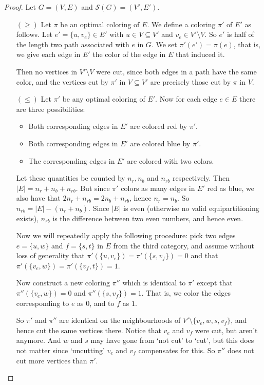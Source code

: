 	\begin{proof}
		Let $G = (V, E)$ and $\mathcal{S}(G) = (V', E')$.
		\begin{enumerate}
			\item[$(\geq)$] Let $\pi$ be an optimal coloring of $E$. We define
					a coloring $\pi'$ of $E'$ as follows. Let
					$e' = \{u, v_e\} \in E'$ with $u \in V \subseteq V'$ and
					$v_e \in V' \setminus V$. So $e'$ is half of the length two
					path associated with $e$ in $G$. We set
					$\pi'(e') = \pi(e)$, that is, we give each edge in $E'$ the
					color of the edge in $E$ that induced it.

					Then no vertices in $V'\setminus V$ were cut, since
					both edges in a path have the same color, and the vertices
					cut by $\pi'$ in $V \subseteq V'$ are precisely those
					cut by $\pi$ in $V$.
			\item[$(\leq)$] Let $\pi'$ be any optimal coloring of $E'$. Now for
					each edge $e \in E$ there are three possibilities:
					\begin{itemize}
						\item Both corresponding edges in $E'$ are colored red
							by $\pi'$.
						\item Both corresponding edges in $E'$ are colored blue
							by $\pi'$.
						\item The corresponding edges in $E'$ are colored with
							two colors.
					\end{itemize}
					Let these quantities be counted by $n_r, n_b$ and $n_{rb}$
					respectively. Then $|E| = n_r + n_b + n_{rb}$. But since
					$\pi'$ colors as many edges in $E'$ red as blue, we also
					have that $2n_r + n_{rb} = 2n_b + n_{rb}$, hence
					$n_r = n_b$. So $n_{rb} = |E| - (n_r + n_b)$. Since $|E|$
					is even (otherwise no valid equipartitioning exists),
					$n_{rb}$ is the difference between two even numbers, and
					hence even.

					Now we will repeatedly apply the following procedure: pick
					two edges $e = \{u, w\}$ and $f = \{s, t\}$ in $E$
					from the third category, and assume
					without loss of generality that
					$\pi'(\{u, v_e\}) = \pi'(\{s, v_f\}) = 0$ and that
					$\pi'(\{v_e, w\}) = \pi'(\{v_f, t\}) = 1$.

					Now construct a new coloring $\pi''$ which is identical to
					$\pi'$ except that $\pi''(\{v_e, w\}) = 0$ and
					$\pi''(\{s, v_f\}) = 1$. That is, we color the edges
					corresponding to $e$ as $0$, and to $f$ as $1$.

					So $\pi'$ and $\pi''$ are identical on the neighbourhoods
					of $V' \setminus \{ v_e, w, s, v_f\}$, and hence cut the
					same vertices there. Notice that $v_e$ and $v_f$ were cut,
					but
					aren't anymore. And $w$ and $s$ may have gone from
					`not cut' to `cut',
					but this does not matter since `uncutting' $v_e$ and $v_f$
					compensates for this. So $\pi''$ does not cut more
					vertices than $\pi'$.


\end{enumerate}
\end{proof}
